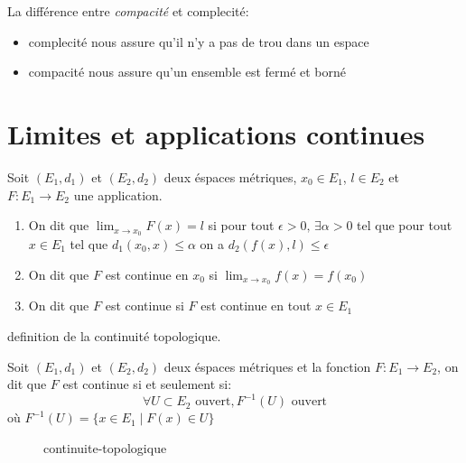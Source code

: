 \begin{property}
    La différence entre \textit{compacité} et {complecité}:
    \begin{itemize}
        \item complecité nous assure qu'il n'y a pas de trou dans un espace
        \item compacité nous assure qu'un ensemble est fermé et borné
    \end{itemize}
\end{property}
\section{Limites et applications continues}
\begin{definition}
    Soit $(E_{1}, d_1)$ et $(E_2, d_2)$ deux éspaces métriques, $x_0 \in E_1$, $l \in E_2$ et $F: E_1 \to E_2$ une application.
    \begin{enumerate}
        \item On dit que $\lim_{x \to x_0} F(x) = l$ si pour tout $\epsilon > 0, \, \exists \alpha > 0$ tel que pour tout $x \in E_1$ tel que  $d_1(x_0, x) \le \alpha$ on a $d_2(f(x), l) \le \epsilon$ 
        \item On dit que $F$ est continue en  $x_0$ si $\lim_{x \to x_0} f(x) = f(x_0)$
        \item On dit que $F$ est continue si  $F$ est continue en tout $x \in E_1$
    \end{enumerate}
\end{definition}
\begin{prop}\label{def:continuite-topologique}
    definition de la continuité topologique.
    \par
    Soit $(E_{1}, d_1)$ et $(E_2, d_2)$ deux éspaces métriques et la fonction $F: E_1 \to E_2$, on dit que  $F$ est continue si et seulement si:
     \[
         \forall U \subset E_2 \text{ ouvert},  F^{-1}(U) \text{ ouvert}
    \] 
    où $F^{-1}(U) = \{ x \in E_1 \mid F(x) \in U\}$
\begin{figure}[H]
    \centering
    \caption{continuite-topologique}
    \label{fig:continuite-topologique}
\end{figure}
\end{prop}


